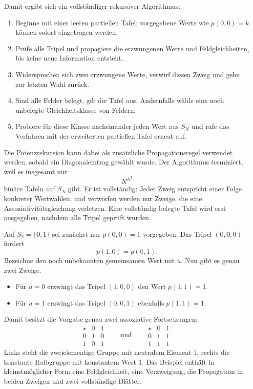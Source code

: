 \documentclass[main.tex]{subfiles}
\begin{document}
Damit ergibt sich ein vollständiger rekursiver Algorithmus:
\begin{enumerate}
  \item Beginne mit einer leeren partiellen Tafel; vorgegebene Werte wie
    \(p(0,0)=k\) können sofort eingetragen werden.
  \item Prüfe alle Tripel und propagiere die erzwungenen Werte und
    Feldgleichheiten, bis keine neue Information entsteht.
  \item Widersprechen sich zwei erzwungene Werte, verwirf diesen Zweig und
    gehe zur letzten Wahl zurück.
  \item Sind alle Felder belegt, gib die Tafel aus.  Andernfalls wähle eine
    noch unbelegte Gleichheitsklasse von Feldern.
  \item Probiere für diese Klasse nacheinander jeden Wert aus \(S_N\) und
    rufe das Verfahren mit der erweiterten partiellen Tafel erneut auf.
\end{enumerate}
Die Potenzrekursion kann dabei als zusätzliche Propagationsregel verwendet
werden, sobald ein Diagonaleintrag gewählt wurde.  Der Algorithmus terminiert,
weil es insgesamt nur
\[
  N^{N^2}
\]
binäre Tafeln auf \(S_N\) gibt.  Er ist vollständig: Jeder Zweig entspricht
einer Folge konkreter Wertwahlen, und verworfen werden nur Zweige, die eine
Assoziativitätsgleichung verletzen.  Eine vollständig belegte Tafel wird erst
ausgegeben, nachdem alle Tripel geprüft wurden.

\begin{example}
Auf \(S_2=\{0,1\}\) sei zunächst nur \(p(0,0)=1\) vorgegeben.  Das Tripel
\((0,0,0)\) fordert
\[
  p(1,0)=p(0,1).
\]
Bezeichne den noch unbekannten gemeinsamen Wert mit \(u\).  Nun gibt es genau
zwei Zweige.
\begin{itemize}
  \item Für \(u=0\) erzwingt das Tripel \((1,0,0)\) den Wert
    \(p(1,1)=1\).
  \item Für \(u=1\) erzwingt das Tripel \((0,0,1)\) ebenfalls
    \(p(1,1)=1\).
\end{itemize}
Damit besitzt die Vorgabe genau zwei assoziative Fortsetzungen:
\[
\begin{array}{c|cc}
\star&0&1\\\hline
0&1&0\\
1&0&1
\end{array}
\qquad\text{und}\qquad
\begin{array}{c|cc}
\star&0&1\\\hline
0&1&1\\
1&1&1
\end{array}.
\]
Links steht die zweielementige Gruppe mit neutralem Element \(1\), rechts
die konstante Halbgruppe mit konstantem Wert \(1\).  Das Beispiel enthält in
kleinstmöglicher Form eine Feldgleichheit, eine Verzweigung, die Propagation
in beiden Zweigen und zwei vollständige Blätter.
\end{example}
\end{document}
